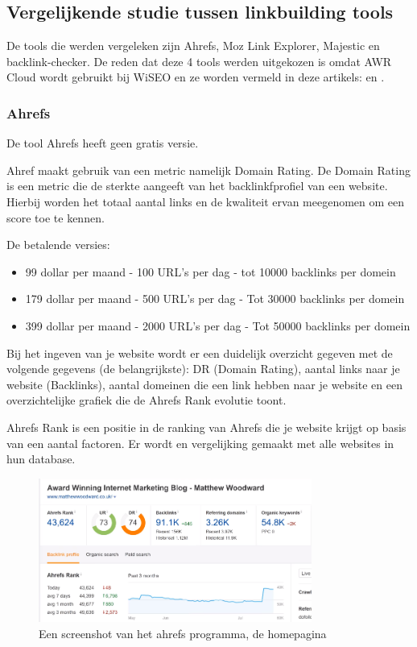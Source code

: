 \subsection{Vergelijkende studie tussen linkbuilding tools}
\label{ch: Vergelijkende studie tussen linkbuilding tools}

De tools die werden vergeleken zijn Ahrefs, Moz Link Explorer, Majestic en backlink-checker. De reden dat deze 4 tools werden uitgekozen is omdat AWR Cloud wordt gebruikt bij WiSEO en ze worden vermeld in deze artikels: \textcite{SEO13} en \textcite{SEOCOMPLETE}.  

\subsubsection{Ahrefs}
\label{ch: Ahrefs}
De tool Ahrefs heeft geen gratis versie. 

Ahref maakt gebruik van een metric namelijk Domain Rating. De Domain Rating is een metric die de sterkte aangeeft van het backlinkfprofiel van een website. Hierbij worden het totaal aantal links en de kwaliteit ervan meegenomen om een score toe te kennen. 

De betalende versies: 
\begin{itemize}
\item 99 dollar per maand - 100 URL's per dag - tot 10000 backlinks per domein
\item 179 dollar per maand - 500 URL's per dag - Tot 30000 backlinks per domein
\item 399 dollar per maand - 2000 URL's per dag - Tot 50000 backlinks per domein
\end{itemize}

Bij het ingeven van je website wordt er een duidelijk overzicht gegeven met de volgende gegevens (de belangrijkste): DR (Domain Rating), aantal links naar je website (Backlinks), aantal domeinen die een link hebben naar je website en een overzichtelijke grafiek die de Ahrefs Rank evolutie toont. 

Ahrefs Rank is een positie in de ranking van Ahrefs die je website krijgt op basis van een aantal factoren. Er wordt en vergelijking gemaakt met alle websites in hun database.

\begin{figure}[h!]
\centering
\includegraphics[width=0.8\textwidth]{img/ahrefs.PNG}
\caption{Een screenshot van het ahrefs programma, de homepagina
\autocite{ahrefs}}
\end{figure}

